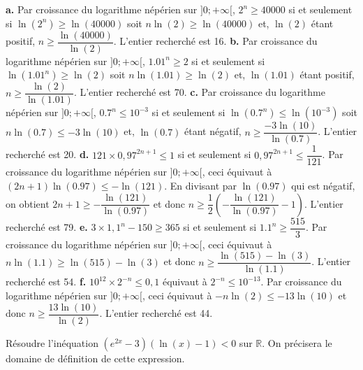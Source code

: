 \documentclass[11pt,fleqn, openany]{book} %
\begin{document}
\begin{solution}\textbf{a.}  Par croissance du logarithme népérien sur $]0;+\infty[$, $2^n \geqslant 40000$ si et seulement si $\ln(2^n) \geqslant \ln(40000)$ soit $n\ln(2) \geqslant \ln(40000)$ et, $\ln(2)$ étant positif, $n \geqslant \dfrac{\ln(40000)}{\ln(2)}$. L'entier recherché est 16.
\vskip5pt
\textbf{b.}  Par croissance du logarithme népérien sur $]0;+\infty[$, $1.01^n \geqslant 2$ si et seulement si $\ln(1.01^n) \geqslant \ln(2)$ soit $n\ln(1.01) \geqslant \ln(2)$ et, $\ln(1.01)$ étant positif, $n \geqslant \dfrac{\ln(2)}{\ln(1.01)}$. L'entier recherché est 70.
\vskip5pt
\textbf{c.}  Par croissance du logarithme népérien sur $]0;+\infty[$, $0.7^n \leqslant 10^{-3}$ si et seulement si $\ln(0.7^n) \leqslant \ln(10^{-3})$ soit $n\ln(0.7) \leqslant -3\ln(10)$ et, $\ln(0.7)$ étant négatif, $n \geqslant \dfrac{-3\ln(10)}{\ln(0.7)}$. L'entier recherché est 20.
\vskip5pt
\textbf{d.} \(121 \times 0,97^{2n+1} \leqslant 1\) si et seulement si \(0,97^{2n+1} \leqslant \dfrac{1}{121}\). Par croissance du logarithme népérien sur \(]0;+\infty[\), ceci équivaut à \((2n+1)\ln(0.97) \leqslant -\ln(121)\). En divisant par \(\ln(0.97)\) qui est négatif, on obtient \(2n+1\geqslant -\dfrac{\ln(121)}{\ln(0.97)}\) et donc \(n \geqslant \dfrac{1}{2}\left(-\dfrac{\ln(121)}{\ln(0.97)}-1\right)\). L'entier recherché est 79.
\vskip5pt
\textbf{e.} \(3 \times 1,1^n -150 \geqslant 365\) si et seulement si \(1.1^n \geqslant \dfrac{515}{3}\). Par croissance du logarithme népérien sur \(]0;+\infty[\), ceci équivaut à \(n\ln(1.1)\geqslant \ln(515)-\ln(3)\) et donc \(n\geqslant \dfrac{\ln(515)-\ln(3)}{\ln(1.1)}\). L'entier recherché est 54.
\vskip5pt
\textbf{f.}  \( 10^{12}\times 2^{-n} \leqslant 0,1\) équivaut à \(2^{-n} \leqslant 10^{-13}\). Par croissance du logarithme népérien sur \(]0;+\infty[\), ceci équivaut à \(-n\ln(2) \leqslant -13\ln(10)\) et donc \(n\geqslant \dfrac{13\ln(10)}{\ln(2)}\). L'entier recherché est 44.
\end{solution}



\begin{exercise}[topic=log03]Résoudre l'inéquation $(e^{2x}-3)(\ln(x)-1)<0$ sur $\mathbb{R}$. On précisera le domaine de définition de cette expression.\end{exercise}
\end{document}
